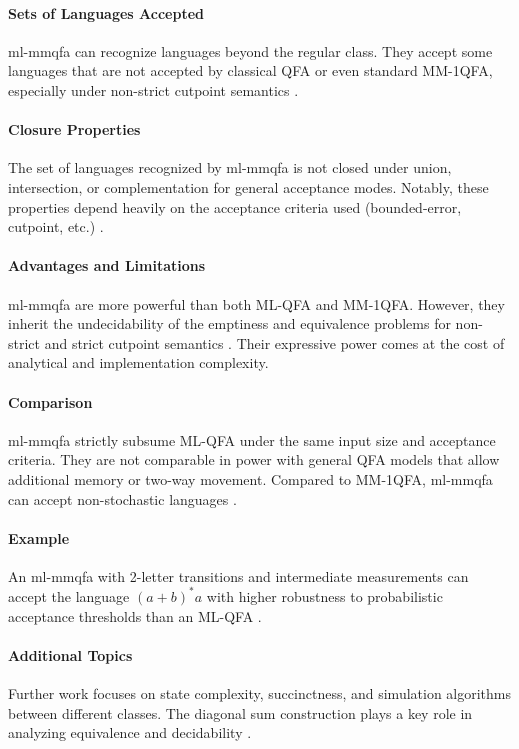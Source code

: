 \paragraph{Sets of Languages Accepted}
\gls{ml-mmqfa} can recognize languages beyond the regular class. They accept some languages that are not accepted by classical QFA or even standard MM-1QFA, especially under non-strict cutpoint semantics \cite{qiu2009hierarchy, lin2012equivalence}.

\paragraph{Closure Properties}
The set of languages recognized by \gls{ml-mmqfa} is not closed under union, intersection, or complementation for general acceptance modes. Notably, these properties depend heavily on the acceptance criteria used (bounded-error, cutpoint, etc.) \cite{qiu2009hierarchy}.

\paragraph{Advantages and Limitations}
\gls{ml-mmqfa} are more powerful than both ML-QFA and MM-1QFA. However, they inherit the undecidability of the emptiness and equivalence problems for non-strict and strict cutpoint semantics \cite{qiu2008decidability, lin2012equivalence}. Their expressive power comes at the cost of analytical and implementation complexity.

\paragraph{Comparison} 
\gls{ml-mmqfa} strictly subsume ML-QFA under the same input size and acceptance criteria. They are not comparable in power with general QFA models that allow additional memory or two-way movement. Compared to MM-1QFA, \gls{ml-mmqfa} can accept non-stochastic languages \cite{qiu2009hierarchy}.

\paragraph{Example}
An \gls{ml-mmqfa} with 2-letter transitions and intermediate measurements can accept the language $(a+b)^*a$ with higher robustness to probabilistic acceptance thresholds than an ML-QFA \cite{belovs2007multi}.

\paragraph{Additional Topics}
Further work focuses on state complexity, succinctness, and simulation algorithms between different classes. The diagonal sum construction plays a key role in analyzing equivalence and decidability \cite{lin2012equivalence}.



